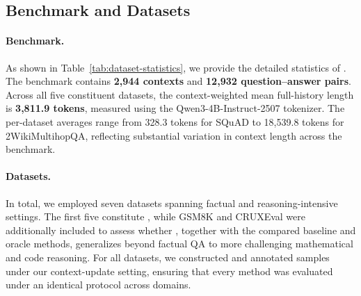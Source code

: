 \subsection{Benchmark and Datasets}
\label{app:benchmark-datasets}

\paragraph{Benchmark.}
As shown in Table~\ref{tab:dataset-statistics}, we provide the detailed statistics of \benchmark{}. The benchmark contains \textbf{2,944 contexts} and \textbf{12,932 question--answer pairs}. Across all five constituent datasets, the context-weighted mean full-history length is \textbf{3,811.9 tokens}, measured using the Qwen3-4B-Instruct-2507 tokenizer. The per-dataset averages range from 328.3 tokens for SQuAD to 18,539.8 tokens for 2WikiMultihopQA, reflecting substantial variation in context length across the benchmark.

\paragraph{Datasets.}
In total, we employed seven datasets spanning factual and reasoning-intensive settings.
The first five constitute \benchmark{}, while GSM8K and CRUXEval were additionally included to assess whether \method{}, together with the compared baseline and oracle methods, generalizes beyond factual QA to more challenging mathematical and code reasoning.
For all datasets, we constructed and annotated samples under our context-update setting, ensuring that every method was evaluated under an identical protocol across domains.

